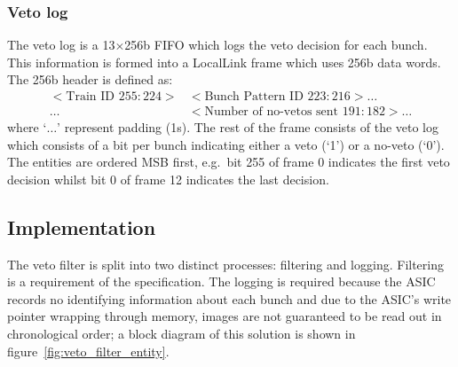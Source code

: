 \subsubsection{Veto log} %
\label{sub:veto_locallink}
The veto log is a 13\( \times \)256b FIFO which logs the veto decision for each bunch. This information is formed into a LocalLink frame which uses 256b data words. The 256b header is defined as:
\begin{equation}\label{fmt:ll_header}
  \begin{split}
  <\text{Train ID } 255:224>&<\text{Bunch Pattern ID } 223:216>\ldots              \\
                           \ldots&<\text{Number of no-vetos sent } 191:182> \ldots
  \end{split}
\end{equation}
where `\( \dots \)' represent padding (1s). The rest of the frame consists of the veto log which consists of a bit per bunch indicating either a veto (`1') or a no-veto (`0'). The entities are ordered MSB first, e.g.\ bit 255 of frame 0 indicates the first veto decision whilst bit 0 of frame 12 indicates the last decision. 
\subsection{Implementation} %
\label{sub:veto_implementation}
The veto filter is split into two distinct processes: filtering and logging. Filtering is a requirement of the specification. The logging is required because the ASIC records no identifying information about each bunch and due to the ASIC's write pointer wrapping through memory, images are not guaranteed to be read out in chronological order; a block diagram of this solution is shown in figure~\ref{fig:veto_filter_entity}.
    
